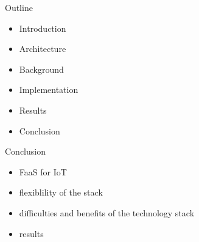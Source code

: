 \documentclass[aspectratio=169]{beamer}
\begin{document}
  \maketitle

  \begin{frame}{Outline}
    \begin{itemize}
      \item Introduction
      \item Architecture
      \item Background
      \item Implementation
      \item Results
      \item Conclusion
    \end{itemize}
  \end{frame}

  
  
  
  
  

  \begin{frame}{Conclusion}
    \begin{itemize}
      \item FaaS for IoT
      \item flexiblility of the stack
      \item difficulties and benefits of the technology stack
      \item results
    \end{itemize}
  \end{frame}
\end{document}
